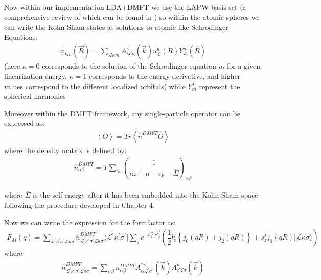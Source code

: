 \documentclass[10pt]{ruthesis}
\begin{document}
{ 
 Now within our implementation LDA+DMFT we use the LAPW basis set (a comprehensive review of which can be found in \cite{LAPW_Book}) so within the atomic spheres we can write the Kohn-Sham states as solutions to atomic-like Schrodinger Equations:
 \begin{align}
 \psi_{ki \sigma}(\vec{R})=\sum_{\mathcal{L}\kappa m} A_{i \mathcal{L} \sigma }^{\kappa}(\vec{k}) u_{\mathcal{L}}^{\kappa}(R) Y_{\mathcal{L}}^{m}(\hat{R})
 \end{align}
 (here $\kappa=0 $ corresponds to the solution of the Schrodinger equation $u_{l}$ for a given linearization energy, $\kappa=1$ corresponds to the energy derivative, and higher values correspond to the different localized orbitals) while $Y_m^{\mathcal{L}}$ represent the spherical harmonics
 
 Moreover within the DMFT framework, any single-particle operator can be expressed as:
 \begin{align}
 \left\langle O \right\rangle = Tr \left\langle \hat{n}^{DMFT} \hat{O} \right\rangle
 \end{align}
where the density matrix is defined by:
\begin{align}
\hat{n}^{DMFT}_{\alpha \beta}=T \sum_{\iota \omega} \left( \dfrac{1}{\iota \omega +\mu -\epsilon_{k}-\overline{\Sigma}} \right)_{\alpha \beta}
\end{align}

where $\overline{\Sigma}$ is the self energy after it has been embedded into the Kohn Sham space following the procedure developed in Chapter 4.

Now we can write the expression for the formfactor as:
\begin{align}
F_{M}(q)=\sum_{\mathcal{L}^{'}\kappa^{'}\sigma^{'} \mathcal{L}\kappa\sigma} \hat{n}^{DMFT}_{\mathcal{L}^{'}\kappa^{'}\sigma^{'} \mathcal{L}\kappa\sigma} \langle \mathcal{L}^{'}\kappa^{'}\sigma^{'} | \sum_{j} e^{-i\vec{q}.\vec{r'_j}} \left( \dfrac{1}{2} l^{j}_{z} \left \lbrace j_{0}(qR) +j_{2}(qR) \right \rbrace + s^{j}_{z} j_0(qR) |\mathcal{L}\kappa\sigma \rangle \right)
\end{align}
where 
\begin{align}
\hat{n}^{DMFT}_{\mathcal{L}^{'}\kappa^{'}\sigma^{'} \mathcal{L}\kappa\sigma}=\sum_{\alpha \beta} n^{DMFT}_{\alpha \beta} A^{* \kappa^{'}}_{\alpha \mathcal{L}^{'} \sigma^{'}}(\vec{k}) A^{ \kappa}_{\beta \mathcal{L}\sigma}(\vec{k})
\end{align}

}
\end{document}
